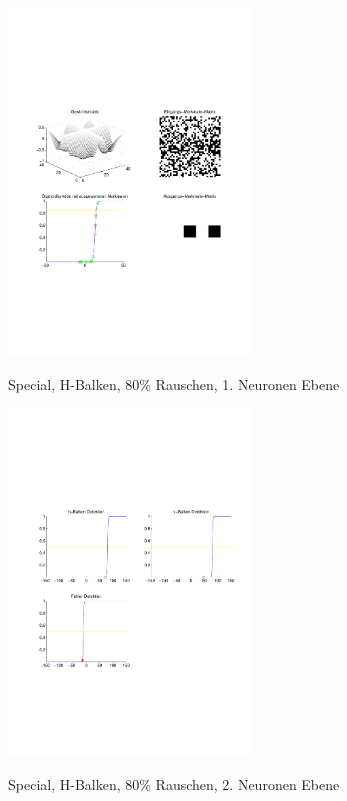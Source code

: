 \begin{figure}[hbt]
	\begin{minipage}[c]{\textwidth}
		\centering
       	\includegraphics[trim=71 213 43 212, clip, width=0.58\textwidth]{./Bilder/Auswertung/Endergebnis/TypeSpecial_Rauschen80_H_Line_Layer1}
		\caption{Special, H-Balken, 80\% Rauschen, 1. Neuronen Ebene}
		\label{Special_H_80_1}
		\vfill
		\includegraphics[trim=71 213 43 212, clip, width=0.58\textwidth]{./Bilder/Auswertung/Endergebnis/TypeSpecial_Rauschen80_H_Line_Layer2}
		\caption{Special, H-Balken, 80\% Rauschen, 2. Neuronen Ebene}
		\label{Special_H_80_2}
	\end{minipage}
\end{figure}
\clearpage

